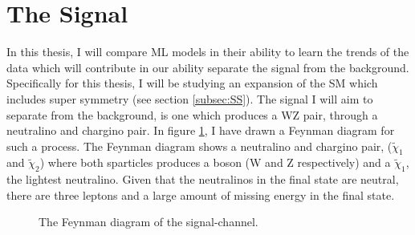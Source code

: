 \section{The Signal}\label{sec:signal}
In this thesis, I will compare \ac{ML} models in their ability to learn the trends of the data which will contribute  
in our ability separate the signal from the background. Specifically for this thesis, I will be studying an expansion of the 
\ac{SM} which includes super symmetry (see section \ref{subsec:SS}). The signal I will aim to separate from the background, is one 
which produces a WZ pair, through a neutralino and chargino pair. In figure \ref{fig:signal}, I have drawn a Feynman diagram for 
such a process. The Feynman diagram shows a neutralino and chargino pair, ($\tilde{\chi}_1$ and $\tilde{\chi}_2$)
where both sparticles produces a boson (W and Z respectively) and a $\tilde{\chi}_1$, the lightest neutralino. Given that the 
neutralinos in the final state are neutral, there are three leptons and a large amount of missing energy in the final state.
\begin{figure}
    \centering
    \caption{The Feynman diagram of the signal-channel.}
    \label{fig:signal}
\end{figure}